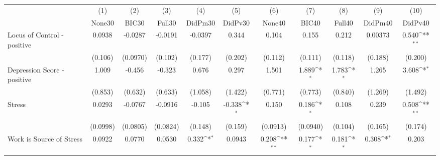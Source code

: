 {
\def\sym#1{\ifmmode^{#1}\else\(^{#1}\)\fi}
\begin{tabular}{l*{10}{c}}
\toprule
            &\multicolumn{1}{c}{(1)}&\multicolumn{1}{c}{(2)}&\multicolumn{1}{c}{(3)}&\multicolumn{1}{c}{(4)}&\multicolumn{1}{c}{(5)}&\multicolumn{1}{c}{(6)}&\multicolumn{1}{c}{(7)}&\multicolumn{1}{c}{(8)}&\multicolumn{1}{c}{(9)}&\multicolumn{1}{c}{(10)}\\
            &\multicolumn{1}{c}{None30}&\multicolumn{1}{c}{BIC30}&\multicolumn{1}{c}{Full30}&\multicolumn{1}{c}{DidPm30}&\multicolumn{1}{c}{DidPv30}&\multicolumn{1}{c}{None40}&\multicolumn{1}{c}{BIC40}&\multicolumn{1}{c}{Full40}&\multicolumn{1}{c}{DidPm40}&\multicolumn{1}{c}{DidPv40}\\
\midrule
Locus of Control - positive&      0.0938         &     -0.0287         &     -0.0191         &     -0.0397         &       0.344         &       0.104         &       0.155         &       0.212         &     0.00373         &       0.540\sym{**} \\
            &     (0.106)         &    (0.0970)         &     (0.102)         &     (0.177)         &     (0.202)         &     (0.112)         &     (0.111)         &     (0.118)         &     (0.188)         &     (0.200)         \\
\addlinespace
Depression Score - positive&       1.009         &      -0.456         &      -0.323         &       0.676         &       0.297         &       1.501         &       1.889\sym{*}  &       1.783\sym{*}  &       1.265         &       3.608\sym{*}  \\
            &     (0.853)         &     (0.632)         &     (0.633)         &     (1.058)         &     (1.422)         &     (0.771)         &     (0.773)         &     (0.840)         &     (1.269)         &     (1.492)         \\
\addlinespace
Stress      &      0.0293         &     -0.0767         &     -0.0916         &      -0.105         &      -0.338\sym{*}  &       0.150         &       0.186\sym{*}  &       0.108         &       0.239         &       0.508\sym{**} \\
            &    (0.0998)         &    (0.0805)         &    (0.0824)         &     (0.148)         &     (0.159)         &    (0.0913)         &    (0.0940)         &     (0.104)         &     (0.165)         &     (0.174)         \\
\addlinespace
Work is Source of Stress&      0.0922         &      0.0770         &      0.0530         &       0.332\sym{*}  &      0.0943         &       0.208\sym{**} &       0.177\sym{*}  &       0.181\sym{*}  &       0.308\sym{*}  &       0.203         \\

\end{tabular}}
